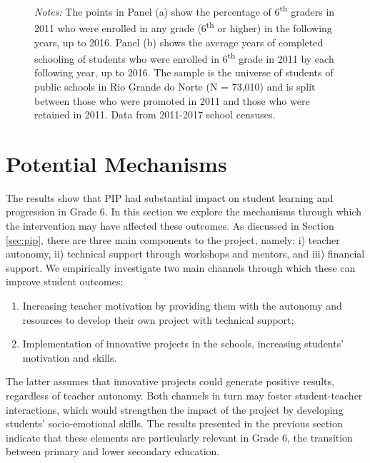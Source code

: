 \documentclass[11pt,a4paper]{article}
\begin{document}
\begin{figure}[ht!]
    \begin{minipage}{0.825\textwidth}
        \small{\textit{Notes:} The points in Panel (a) show the percentage of 6\textsuperscript{th} graders in 2011 who were enrolled in any grade (6\textsuperscript{th} or higher) in the following years, up to 2016. Panel (b) shows the average years of completed schooling of students who were enrolled in 6\textsuperscript{th} grade in 2011 by each following year, up to 2016. The sample is the universe of students of public schools in Rio Grande do Norte (N = 73,010) and is split between those who were promoted in 2011 and those who were retained in 2011. Data from 2011-2017 school censuses.}
    \end{minipage}
\end{figure}


\section{Potential Mechanisms} \label{sec:mechanism}

The results show that PIP had substantial impact on student learning and progression in Grade 6. In this section we explore the mechanisms through which the intervention may have affected these outcomes. As discussed in Section \ref{sec:pip}, there are three main components to the project, namely: i) teacher autonomy, ii) technical support through workshops and mentors, and iii) financial support. We empirically investigate two main channels through which these can improve student outcomes: 
\begin{enumerate}[nosep]
    \item Increasing teacher motivation by providing them with the autonomy and resources to develop their own project with technical support;
    \item Implementation of innovative projects in the schools, increasing students' motivation and skills.
\end{enumerate}

The latter assumes that innovative projects could generate positive results, regardless of teacher autonomy. Both channels in turn may foster student-teacher interactions, which would strengthen the impact of the project by developing students' socio-emotional skills. The results presented in the previous section indicate that these elements are particularly relevant in Grade 6, the transition between primary and lower secondary education. 
\end{document}
